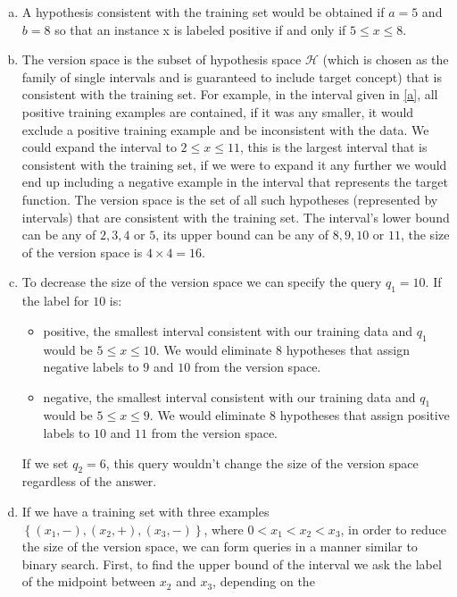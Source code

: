 \documentclass[12pt]{article}
\begin{document}
\begin{enumerate}[(a)]
   \item \label{a} A hypothesis consistent with the training set would be
obtained if $a = 5$ and $b = 8$ so that an instance x is labeled positive
if and only if $5 \leq x \leq 8$.
   \item The version space is the subset of hypothesis space
$\mathcal{H}$ (which is chosen as the family of single intervals and
is guaranteed to include target concept) that is consistent with the
training set. For example, in the interval given in \ref{a}, all
positive training examples are contained, if it was any smaller, it
would exclude a positive training example and be inconsistent with the
data. We could expand the interval to $2 \leq x \leq 11$, this is the
largest interval that is consistent with the training set, if we were
to expand it any further we would end up including a negative example
in the interval that represents the target function. The version space
is the set of all such hypotheses (represented by intervals) that are
consistent with the training set. The interval's lower bound can be
any of $2, 3, 4$ or $5$, its upper bound can be any of $8, 9, 10$ or
$11$, the size of the version space is $4 \times 4 = 16$.
   \item To decrease the size of the version space we can specify the
query $q_1 = 10$. If the label for $10$ is:
      \begin{itemize}
         \item positive, the smallest interval consistent with our
training data and $q_1$ would be $5 \leq x \leq 10$. We would
eliminate $8$ hypotheses that assign negative labels to $9$ and $10$
from the version space.
         \item negative, the smallest interval consistent with our
training data and $q_1$ would be $5 \leq x \leq 9$. We would eliminate
$8$ hypotheses that assign positive labels to $10$ and $11$ from the
version space.
      \end{itemize}           
If we set $q_2 = 6$, this query wouldn't change the size of the
version space regardless of the answer.
   \item If we have a training set with three examples $\left\{
\left(x_{1}, - \right), \left(x_{2}, + \right), \left(x_{3}, -
\right)\right\}$, where $0 < x_1 < x_2 < x_3$, in order to reduce the
size of the version space, we can form queries in a manner similar to
binary search. First, to find the upper bound of the interval we ask
the label of the midpoint between $x_2$ and $x_3$, depending on the

\end{enumerate}
\end{document}

